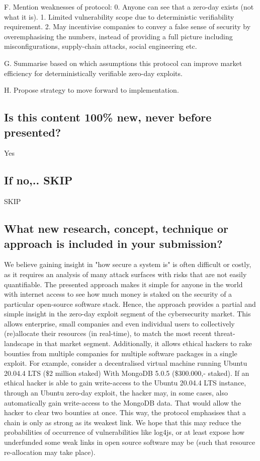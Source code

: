 \documentclass{article}
\begin{document}
F. Mention weaknesses of protocol: 
0. Anyone can see that a zero-day exists (not what it is). 
1. Limited vulnerability scope due to deterministic verifiability requirement. 
2. May incentivise companies to convey a false sense of security by overemphasising the numbers, instead of providing a full picture including misconfigurations, supply-chain attacks, social engineering etc.

G. Summarise based on which assumptions this protocol can improve market efficiency for deterministically verifiable zero-day exploits. 

H. Propose strategy to move forward to implementation.
\subsection{Is this content 100\% new, never before presented?}
Yes
\subsection{If no,.. SKIP}
SKIP
\subsection{What new research, concept, technique or approach is included in your submission?}
We believe gaining insight in "how secure a system is" is often difficult or costly, as it requires an analysis of many attack surfaces with risks that are not easily quantifiable. The presented approach makes it simple for anyone in the world with internet access to see how much money is staked on the security of a particular open-source software stack. Hence, the approach provides a partial and simple insight in the zero-day exploit segment of the cybersecurity market. This allows enterprise, small companies and even individual users to collectively (re)allocate their resources (in real-time), to match the most recent threat-landscape in that market segment. Additionally, it allows ethical hackers to rake bounties from multiple companies for multiple software packages in a single exploit. For example, consider a decentralised virtual machine running Ubuntu 20.04.4 LTS (\$2 million staked) With MongoDB 5.0.5 (\$300.000,- staked). If an ethical hacker is able to gain write-access to the Ubuntu 20.04.4 LTS instance, through an Ubuntu zero-day exploit, the hacker may, in some cases, also automatically gain write-access to the MongoDB data. That would allow the hacker to clear two bounties at once. This way, the protocol emphasises that a chain is only as strong as its weakest link. We hope that this may reduce the probabilities of occurrence of vulnerabilities like log4js, or at least expose how underfunded some weak links in open source software may be (such that resource re-allocation may take place).
\end{document}
